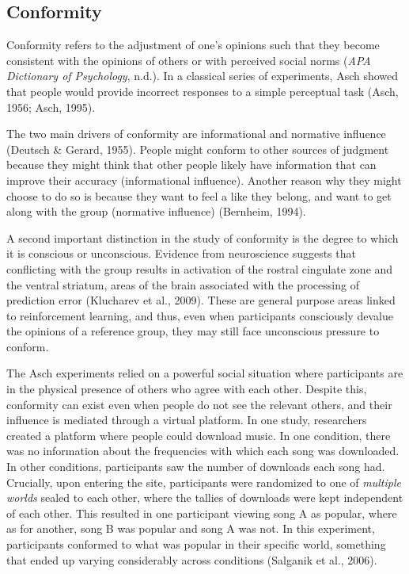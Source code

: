 \documentclass[
  man ,floatsintext]{apa7}
\begin{document}
\hypertarget{conformity}{%
\subsection{Conformity}\label{conformity}}

Conformity refers to the adjustment of one's opinions such that they become consistent with the opinions of others or with perceived social norms (\emph{APA Dictionary of Psychology}, n.d.). In a classical series of experiments, Asch showed that people would provide incorrect responses to a simple perceptual task (Asch, 1956; Asch, 1995).

The two main drivers of conformity are informational and normative influence (Deutsch \& Gerard, 1955). People might conform to other sources of judgment because they might think that other people likely have information that can improve their accuracy (informational influence). Another reason why they might choose to do so is because they want to feel a like they belong, and want to get along with the group (normative influence) (Bernheim, 1994).

A second important distinction in the study of conformity is the degree to which it is conscious or unconscious. Evidence from neuroscience suggests that conflicting with the group results in activation of the rostral cingulate zone and the ventral striatum, areas of the brain associated with the processing of prediction error (Klucharev et al., 2009). These are general purpose areas linked to reinforcement learning, and thus, even when participants consciously devalue the opinions of a reference group, they may still face unconscious pressure to conform.

The Asch experiments relied on a powerful social situation where participants are in the physical presence of others who agree with each other. Despite this, conformity can exist even when people do not see the relevant others, and their influence is mediated through a virtual platform. In one study, researchers created a platform where people could download music. In one condition, there was no information about the frequencies with which each song was downloaded. In other conditions, participants saw the number of downloads each song had. Crucially, upon entering the site, participants were randomized to one of \emph{multiple worlds} sealed to each other, where the tallies of downloads were kept independent of each other. This resulted in one participant viewing song A as popular, where as for another, song B was popular and song A was not. In this experiment, participants conformed to what was popular in their specific world, something that ended up varying considerably across conditions (Salganik et al., 2006).
\end{document}
